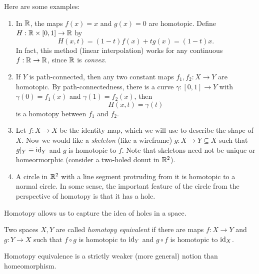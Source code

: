 \begin{example}
  Here are some examples:
  \begin{enumerate}
    \item In $\mathbb{R}$, the maps $f(x) = x$ and
      $g(x) = 0$ are homotopic. Define $H : \mathbb{R} \times [0, 1] \to \mathbb{R}$
      by
      \[
        H(x, t) = (1 - t)f(x) + t g(x) = (1 - t)x.
      \]
      In fact, this method (linear interpolation) works for any continuous
      $f : \mathbb{R} \to \mathbb{R}$, since $\mathbb{R}$ is
      \emph{convex}.
    \item If $Y$ is path-connected, then any
      two constant maps $f_1, f_2 : X \to Y$ are
      homotopic. By path-connectedness, there is a
      curve $\gamma : [0, 1] \to Y$ with $\gamma(0) = f_1(x)$
      and $\gamma(1) = f_2(x)$, then
      \[
        H(x, t) = \gamma(t)
      \]
      is a homotopy between $f_1$ and $f_2$.
    \item Let $f : X \to X$ be the identity map,
      which we will use to describe the shape of $X$.
      Now we would like a \emph{skeleton} (like a
      wireframe) $g : X \to Y \subseteq X$ such that
      $g|_Y \equiv \operatorname{id}_Y$ and $g$ is homotopic
      to $f$. Note that skeletons need not be unique
      or homeormorphic
      (consider a two-holed donut in $\mathbb{R}^2$).
    \item A circle in $\mathbb{R}^2$ with a line segment
      protruding from it is homotopic to a normal circle.
      In some sense, the important feature of the
      circle from the perspective of homotopy is
      that it has a hole.
  \end{enumerate}
\end{example}

\begin{remark}
  Homotopy allows us to capture the idea of holes in
  a space.
\end{remark}

\begin{definition}
  Two spaces $X, Y$ are called \emph{homotopy equivalent}
  if there are maps $f : X \to Y$ and
  $g : Y \to X$ such that $f \circ g$ is homotopic
  to $\operatorname{id}_Y$ and $g \circ f$ is homotopic to $\operatorname{id}_X$.
\end{definition}

\begin{remark}
  Homotopy equivalence is a strictly weaker
  (more general) notion than homeomorphism.
\end{remark}
